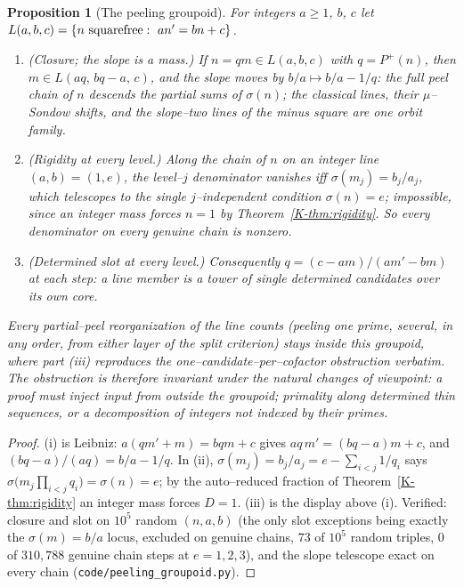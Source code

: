 \documentclass[11pt]{article}
\newtheorem{proposition}[theorem]{Proposition}
\theoremstyle{definition}
\begin{document}
\begin{proposition}[The peeling groupoid]\label{prop:groupoid}
For integers $a\ge1$, $b$, $c$ let $L(a,b,c)=\{n\ \textnormal{squarefree}:\ an'=bn+c\}$.
\begin{enumerate}[label=\textup{(\roman*)},leftmargin=2.2em]
\item \emph{(Closure; the slope is a mass.)} If $n=qm\in L(a,b,c)$ with $q=P^+(n)$, then
$m\in L(aq,\,bq-a,\,c)$, and the slope moves by $b/a\mapsto b/a-1/q$: the full peel chain of $n$
descends the partial sums of $\sigma(n)$; the classical lines, their $\mu$--Sondow shifts, and
the slope--two lines of the minus square are one orbit family.
\item \emph{(Rigidity at every level.)} Along the chain of $n$ on an integer line $(a,b)=(1,e)$,
the level--$j$ denominator vanishes iff $\sigma(m_j)=b_j/a_j$, which telescopes to the single
$j$--independent condition $\sigma(n)=e$; impossible, since an integer mass forces $n=1$ by
Theorem~\ref{K-thm:rigidity}. So every denominator on every genuine chain is nonzero.
\item \emph{(Determined slot at every level.)} Consequently $q=(c-am)/(am'-bm)$ at each step:
a line member is a tower of single determined candidates over its own core.
\end{enumerate}
Every partial--peel reorganization of the line counts (peeling one prime, several, in any
order, from either layer of the split criterion) stays inside this groupoid, where part
\textup{(iii)} reproduces the one--candidate--per--cofactor obstruction verbatim. The obstruction
is therefore \emph{invariant} under the natural changes of viewpoint: a proof must inject input
from outside the groupoid; primality along determined thin sequences, or a decomposition of
integers not indexed by their primes.
\end{proposition}
\begin{proof}
(i) is Leibniz: $a(qm'+m)=bqm+c$ gives $aq\,m'=(bq-a)m+c$, and $(bq-a)/(aq)=b/a-1/q$. In (ii),
$\sigma(m_j)=b_j/a_j=e-\sum_{i<j}1/q_i$ says $\sigma\bigl(m_j\prod_{i<j}q_i\bigr)=\sigma(n)=e$;
by the auto--reduced fraction of Theorem~\ref{K-thm:rigidity} an integer mass forces $D=1$. (iii) is
the display above (i). Verified: closure and slot on $10^5$ random $(n,a,b)$ (the only slot
exceptions being exactly the $\sigma(m)=b/a$ locus, excluded on genuine chains, $73$ of $10^5$
random triples, $0$ of $310{,}788$ genuine chain steps at $e=1,2,3$), and the slope telescope
exact on every chain (\texttt{code/peeling\_groupoid.py}).
\end{proof}
\end{document}
